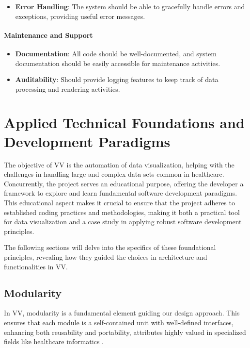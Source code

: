 \begin{itemize}
\item
  \textbf{Error Handling}: The system should be able to gracefully
  handle errors and exceptions, providing useful error messages.
\end{itemize}

\paragraph{Maintenance and Support}\label{maintenance-and-support}

\begin{itemize}
\item
  \textbf{Documentation}: All code should be well-documented, and system
  documentation should be easily accessible for maintenance activities.
\item
  \textbf{Auditability}: Should provide logging features to keep track
  of data processing and rendering activities.
\end{itemize}

\section{Applied Technical Foundations and Development Paradigms}\label{technical-foundations-and-development-paradigms}

The objective of VV is the automation of data visualization, helping
with the challenges in handling large and complex data sets common in
healthcare. Concurrently, the project serves an educational purpose,
offering the developer a framework to explore and learn fundamental
software development paradigms. This educational aspect makes it crucial
to ensure that the project adheres to established coding practices and
methodologies, making it both a practical tool for data visualization
and a case study in applying robust software development principles.

The following sections will delve into the specifics of these
foundational principles, revealing how they guided the choices in
architecture and functionalities in VV.

\subsection{Modularity}\label{modularity}

In VV, modularity is a fundamental element guiding our design approach.
This ensures that each module is a self-contained unit with well-defined
interfaces, enhancing both reusability and portability, attributes
highly valued in specialized fields like healthcare informatics
\cite{39}.

